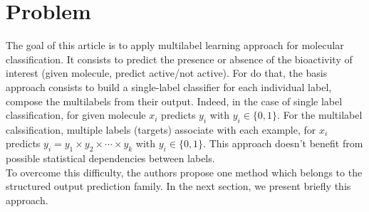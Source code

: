 \documentclass[12pt]{article}
\begin{document}
\section{Problem}
The goal of this article is to apply multilabel learning approach for molecular classification. It consists to predict the presence or absence of the bioactivity of interest (given molecule, predict active/not active). %
For do that, the basis approach consists to build a single-label classifier for each individual label, compose the multilabels from their output. Indeed, in the case of single label classification, for given molecule $x_i$ predicts $y_i$ with $y_i \in \{0,1\}$. For the multilabel calssification, multiple labels (targets) associate with each example, for $x_i$ predicts $y_i = y_1\times y_2\times\cdots\times y_k$ with $y_i \in \{0,1\}$. This approach doesn't benefit from possible statistical dependencies between labels.\\
To overcome this difficulty, the authors propose one method which belongs to the structured output prediction family. In the next section, we present briefly this approach.
\end{document}
